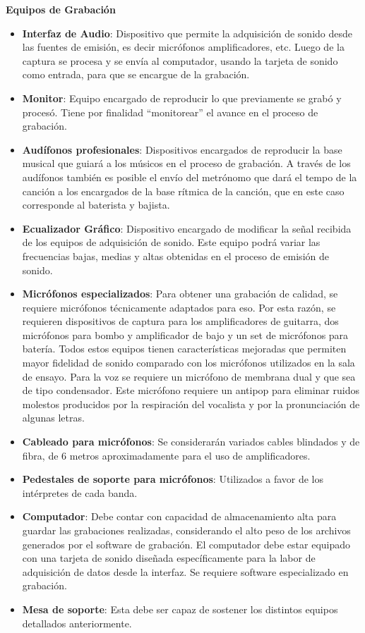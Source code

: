 	
\textbf{Equipos de Grabación}
\begin{itemize}
	\item \textbf{Interfaz de Audio}: Dispositivo que permite la adquisición de
	      sonido desde las fuentes de emisión, es decir micrófonos
	      amplificadores, etc. Luego de la captura se procesa y se envía
	      al computador, usando la tarjeta de sonido como entrada, para
	      que se encargue de la grabación.
	\item \textbf{Monitor}: Equipo encargado de reproducir lo que previamente
	      se grabó y procesó. Tiene por finalidad ``monitorear''
	      el avance en el proceso de grabación.
	\item \textbf{Audífonos profesionales}: Dispositivos encargados de 
	      reproducir la base musical que guiará a los músicos 
	      en el proceso de grabación. A través de los audífonos
	      también es posible el envío del metrónomo que dará
	      el tempo de la canción a los encargados de la base rítmica
	      de la canción, que en este caso corresponde al baterista
	      y bajista.
	\item \textbf{Ecualizador Gráfico}: Dispositivo encargado de modificar
	      la señal recibida de los equipos de adquisición de sonido. Este
	      equipo podrá variar las frecuencias bajas, medias y altas obtenidas
	      en el proceso de emisión de sonido.
	\item \textbf{Micrófonos especializados}: Para obtener una grabación de 
	      calidad, se requiere micrófonos técnicamente adaptados para eso.
	      Por esta razón, se requieren dispositivos de captura para los 
	      amplificadores de guitarra, dos micrófonos para bombo y amplificador
	      de bajo y un set de micrófonos para batería. Todos estos equipos
	      tienen características mejoradas que permiten mayor fidelidad de sonido
	      comparado con los micrófonos utilizados en la sala de ensayo. Para
	      la voz se requiere un micrófono de membrana dual y que sea de tipo
	      condensador. Este micrófono requiere un antipop para eliminar
	      ruidos molestos producidos por la respiración del vocalista y por
	      la pronunciación de algunas letras.
	\item \textbf{Cableado para micrófonos}: Se considerarán variados cables blindados
         y de fibra, de 6 metros aproximadamente para el uso de amplificadores.
	\item \textbf{Pedestales de soporte para micrófonos}: Utilizados a favor
         de los intérpretes de cada banda.
	\item \textbf{Computador}: Debe contar con capacidad de almacenamiento alta para 
	      guardar las grabaciones realizadas, considerando el alto peso
	      de los archivos generados por el software de grabación. El computador
	      debe estar equipado con una tarjeta de sonido diseñada específicamente
	      para la labor de adquisición de datos desde la interfaz. Se requiere
	      software especializado en grabación.
	\item \textbf{Mesa de soporte}: Esta debe ser capaz de sostener los
	      distintos equipos detallados anteriormente.
\end{itemize}

